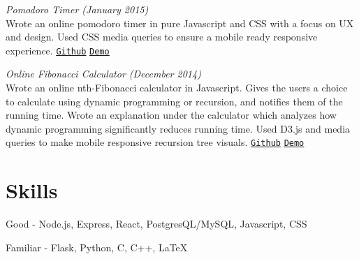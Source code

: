 \documentclass[margin]{res}
\begin{document}
\begin{resume}
\textit{Pomodoro Timer (January 2015)}\\ Wrote an online pomodoro timer in pure Javascript and CSS with a focus on UX and design. Used CSS media queries to ensure a mobile ready responsive experience. \underline{\texttt{\href{https://github.com/keithyong/pomodoro}{Github}}} \underline{\texttt{\href{http://keithy.me/pomodoro}{Demo}}}


\textit{Online Fibonacci Calculator (December 2014)}\\ Wrote an online nth-Fibonacci calculator in Javascript. Gives the users a choice to calculate using dynamic programming or recursion, and notifies them of the running time. Wrote an explanation under the calculator which analyzes how dynamic programming significantly reduces running time. Used D3.js and media queries to make mobile responsive recursion tree visuals. \underline{\texttt{\href{https://github.com/keithyong/fibonacci-calc}{Github}}} \underline{\texttt{\href{http://keithy.me/fibonacci-calc}{Demo}}}


\section{Skills}
Good - Node.js, Express, React, PostgresQL/MySQL, Javascript, CSS

Familiar - Flask, Python, C, C++, LaTeX

\end{resume}
\end{document}
